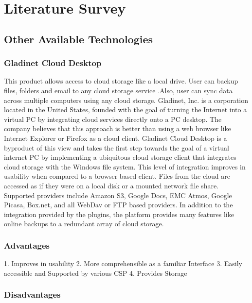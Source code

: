 \chapter{Literature Survey}

\section{Other Available Technologies}

\subsection{Gladinet Cloud Desktop}

  This product allows access to cloud storage like a local drive. User can backup files, folders and email to any cloud storage service .Also, user can sync data across multiple computers using any cloud storage.
  Gladinet, Inc. is a corporation located in the United States, founded with the goal of turning the Internet into a virtual PC by integrating cloud services directly onto a PC desktop. The company believes that this approach is better than using a web browser like Internet Explorer or Firefox as a cloud client. Gladinet Cloud Desktop is a byproduct of this view and takes the first step towards the goal of a virtual internet PC by implementing a ubiquitous cloud storage client that integrates cloud storage with the Windows file system. This level of integration improves in usability when compared to a browser based client. Files from the cloud are accessed as if they were on a local disk or a mounted network file share. Supported providers include Amazon S3, Google Docs, EMC Atmos, Google Picasa, Box.net, and all WebDav or FTP based providers. In addition to the integration provided by the plugins, the platform provides many features like online backups to a redundant array of cloud storage.


\subsection{Advantages}

1.  Improves in usability
2.	More comprehensible as a familiar Interface
3.	Easily accessible and Supported by various CSP
4.	Provides Storage

\subsection{Disadvantages}


